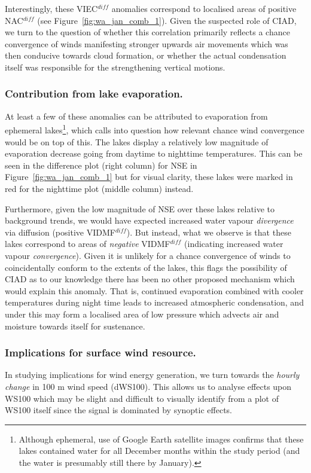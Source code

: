 Interestingly, these \ac{VIEC}$^{diff}$ anomalies correspond to localised areas of positive \ac{NAC}$^{diff}$ (see Figure~\ref{fig:wa_jan_comb_1}). Given the suspected role of \ac{CIAD}, we turn to the question of whether this correlation primarily reflects a chance convergence of winds manifesting stronger upwards air movements which was then conducive towards cloud formation, or whether the actual condensation itself was responsible for the strengthening vertical motions.

\subsubsection{Contribution from lake evaporation.}

At least a few of these anomalies can be attributed to evaporation from ephemeral lakes\footnote{Although ephemeral, use of Google Earth satellite images confirms that these lakes contained water for all December months within the study period (and the water is presumably still there by January).}, which calls into question how relevant chance wind convergence would be on top of this. The lakes display a relatively low magnitude of evaporation decrease going from daytime to nighttime temperatures. This can be seen in the difference plot (right column) for \ac{NSE} in Figure~\ref{fig:wa_jan_comb_1} but for visual clarity, these lakes were marked in red for the nighttime plot (middle column) instead.

Furthermore, given the low magnitude of \ac{NSE} over these lakes relative to background trends, we would have expected increased water vapour \textit{divergence} via diffusion (positive \acs{VIDMF}$^{diff}$). But instead, what we observe is that these lakes correspond to areas of \textit{negative} \ac{VIDMF}$^{diff}$ (indicating increased water vapour \textit{convergence}). Given it is unlikely for a chance convergence of winds to coincidentally conform to the extents of the lakes, this flags the possibility of \ac{CIAD} as to our knowledge there has been no other proposed mechanism which would explain this anomaly. That is, continued evaporation combined with cooler temperatures during night time leads to increased atmospheric condensation, and under this may form a localised area of low pressure which advects air and moisture towards itself for sustenance.

\subsubsection{Implications for surface wind resource.} In studying implications for wind energy generation, we turn towards the \textit{hourly change} in 100 m wind speed (\acs{dWS100}). This allows us to analyse effects upon \acs{WS100} which may be slight and difficult to visually identify from a plot of \ac{WS100} itself since the signal is dominated by synoptic effects.

